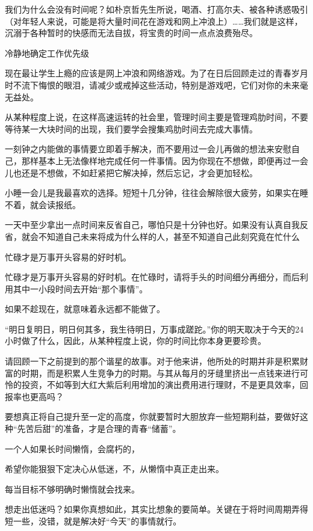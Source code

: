 \documentclass[UTF8,a4paper,8pt]{ctexbook}
\begin{document}
		
		我们为什么会没有时间呢？如朴京哲先生所说，喝酒、打高尔夫、被各种诱惑吸引（对年轻人来说，可能是将大量时间花在游戏和网上冲浪上）……我们就是这样，沉溺于各种暂时的快感而无法自拔，将宝贵的时间一点点浪费殆尽。
		
		
		冷静地确定工作优先级
		
		
		现在最让学生上瘾的应该是网上冲浪和网络游戏。为了在日后回顾走过的青春岁月时不流下悔恨的眼泪，请减少或戒掉这些活动，特别是游戏吧，它们对你的未来毫无益处。
		
		
		从某种程度上说，在这样高速运转的社会里，管理时间主要是管理鸡肋时间，不要等待某一大块时间的出现，我们要学会搜集鸡肋时间去完成大事情。
		
		
		一刻钟之内能做的事情要立即着手解决，而不要用过一会儿再做的想法来安慰自己，那样基本上无法像样地完成任何一件事情。因为你现在不想做，即便再过一会儿也还是不想做，不如赶紧把它解决掉，然后忘记，才会更加轻松。
	
		
		小睡一会儿是我最喜欢的选择。短短十几分钟，往往会解除很大疲劳，如果实在睡不着，就会读报纸。
		
		
		一天中至少拿出一点时间来反省自己，哪怕只是十分钟也好。如果没有认真自我反省，就会不知道自己未来将成为什么样的人，甚至不知道自己此刻究竟在忙什么
		
		
		忙碌才是万事开头容易的好时机。
	
		
		忙碌才是万事开头容易的好时机。在忙碌时，请将手头的时间细分再细分，而后利用其中一小段时间去开始“那个事情”。
	
		
		如果不趁现在，就意味着永远都不能做了。
		
		
		“明日复明日，明日何其多，我生待明日，万事成蹉跎。”你的明天取决于今天的24小时做了什么，因此，从某种程度上说，你的时间比你本身更要珍贵。
	
		
		请回顾一下之前提到的那个谐星的故事。对于他来讲，他所处的时期并非是积累财富的时期，而是积累人生竞争力的时期。与其从每月的牙缝里挤出一点钱来进行可怜的投资，不如等到大红大紫后利用增加的演出费用进行理财，不是更具效率，回报率也更高吗？
		
		
		要想真正将自己提升至一定的高度，你就要暂时大胆放弃一些短期利益，要做好这种“先苦后甜”的准备，才是合理的青春“储蓄”。
		
		
		一个人如果长时间懒惰，会腐朽的，
		
		
		希望你能狠狠下定决心从低迷，不，从懒惰中真正走出来。
		
		
		每当目标不够明确时懒惰就会找来。
		
		
		想走出低迷吗？如果你真想如此，其实比想象的要简单。关键在于将时间周期弄得短一些，没错，就是解决好“今天”的事情就行。
		
\end{document}
